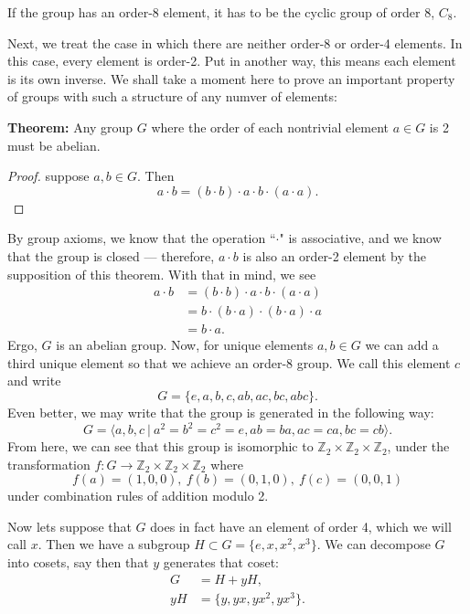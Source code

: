 \documentclass[12pt]{article}
\begin{document}
If the group has an order-8 element, it has to be the cyclic group of order 8,
$C_8$. 

Next, we treat the case in which there are neither order-8 or order-4 elements.
In this case, every element is order-2. Put in another way, this means each
element is its own inverse. We shall take a moment here to prove an important
property of groups with such a structure of any numver of elements:

\textbf{Theorem:} Any group $G$ where the order of each nontrivial element
$a \in G$ is 2 must be abelian. 

\begin{proof}
suppose $a,b \in G$. Then
\[
    a \cdot b = (b \cdot b) \cdot a \cdot b \cdot (a \cdot a).
\]
\end{proof}
By group axioms, we know that the operation ``$\cdot$" is associative, and we
know that the group is closed --- therefore, $a \cdot b$ is also an order-2
element by the supposition of this theorem. With that in mind, we see
\begin{align*}
    a \cdot b &= (b \cdot b) \cdot a \cdot b \cdot (a \cdot a)\\
              &= b \cdot (b \cdot a) \cdot (b \cdot a) \cdot a\\
              &= b \cdot a.
\end{align*}
Ergo, $G$ is an abelian group. Now, for unique elements $a,b \in G$ we can add
a third unique element so that we achieve an order-8 group. We call this
element $c$ and write
\[
    G = \{ e, a, b, c, ab, ac, bc, abc\}.
\]
Even better, we may write that the group is generated in the following way:
\[
 G = \langle a,b,c \ |\  a^2 = b^2 = c^2 = e, ab = ba, ac = ca, bc = cb \rangle. 
\]
From here, we can see that this group is isomorphic to
$\mathbb{Z}_2 \times \mathbb{Z}_2 \times \mathbb{Z}_2$, under the
transformation
$f:G \rightarrow \mathbb{Z}_2 \times \mathbb{Z}_2 \times \mathbb{Z}_2$ where
\[ 
f(a) = (1,0,0), \ f(b) = (0,1,0), \ f(c) = (0,0,1)
\]
under combination rules of addition modulo 2. 

Now lets suppose that $G$ does in fact have an element of order 4, which we
will call $x$. Then we have a subgroup $H \subset G = \{ e, x, x^2, x^3\}$.
We can decompose $G$ into cosets, say then that $y$ generates that coset:
\begin{align*}
    G  &= H + yH, \\
    yH &= \{ y, yx, yx^2, yx^3\}.
\end{align*}
\end{document}
